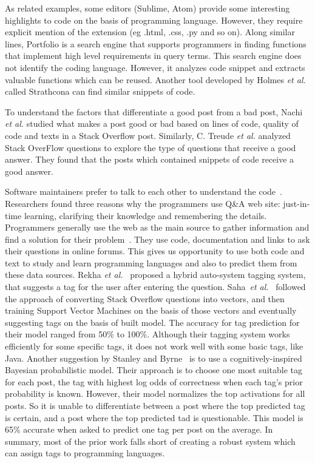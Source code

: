 \documentclass[letterpaper, 10 pt, conference]{ieeeconf}  %
\begin{document}
As related examples, some editors (Sublime, Atom) provide some interesting highlights to code on the basis of programming language. However, they require explicit mention of the extension (eg .html, .css, .py and so on). Along similar lines, Portfolio \cite{c6} is a search engine that supports programmers in finding functions that implement high level requirements in query terms. This search engine does not identify the coding language. However, it analyzes code snippet and extracts valuable functions which can be reused. Another tool developed by Holmes \textit{et al.} \cite{c8} called Strathcona can find similar snippets of code.
 
To understand the factors that differentiate a good post from a bad post, Nachi \textit{et al.} \cite{c3} studied what makes a post good or bad based on lines of code, quality of code and texts in a Stack Overflow post. Similarly, C. Treude \textit{et al.} \cite{c5} analyzed Stack OverFlow questions to explore the type of questions that receive a good answer. They found that the posts which contained snippets of code receive a good answer. 
 
Software maintainers prefer to talk to each other to understand the code~\cite{c9}. Researchers found three reasons why the programmers use Q\&A web site: just-in-time learning, clarifying their knowledge and remembering the details. Programmers generally use the web as the main source to gather information and find a solution for their problem~\cite{c4}. They use code, documentation and links to ask their questions in online forums. This gives us opportunity to use both code and text to study and learn programming languages and also to predict them from these data sources.
Rekha \textit{et al.}~\cite{c10} proposed a hybrid auto-system tagging system, that suggests a tag for the user after entering the question. Saha~\textit{et al.}~\cite{c1} followed the approach of converting Stack Overflow questions into vectors, and then training Support Vector Machines on the basis of those vectors and eventually suggesting tags on the basis of built model. The accuracy for tag prediction for their model ranged from 50\% to 100\%. Although their tagging system works efficiently for some specific tags, it does not work well with some basic tags, like Java. Another suggestion by Stanley and Byrne~\cite{c2} is to use a cognitively-inspired Bayesian probabilistic model. Their approach is to choose one most suitable tag for each post, the tag with highest log odds of correctness when each tag's prior probability is known. However, their model normalizes the top activations for all posts. So it is unable to differentiate between a post where the top predicted tag is certain, and a post where the top predicted tad is questionable. This model is 65\% accurate when asked to predict one tag per post on the average. In summary, most of the prior work falls short of creating a robust system which can assign tags to programming languages.
\end{document}
